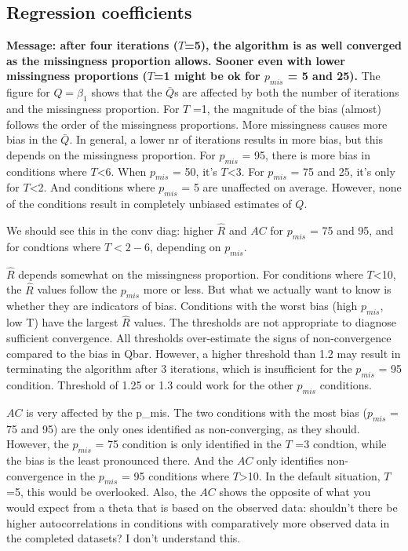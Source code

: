 \documentclass[Royal,times,sageh]{sagej}
\begin{document}
\hypertarget{regression-coefficients}{%
\subsection{Regression coefficients}\label{regression-coefficients}}

\textbf{Message: after four iterations (\(T\)=5), the algorithm is as well converged as the missingness proportion allows. Sooner even with lower missingness proportions (\(T\)=1 might be ok for \(p_{mis}\) = 5 and 25).} The figure for \(Q=\beta_1\) shows that the \(\bar{Q}\)s are affected by both the number of iterations and the missingness proportion. For \(T\) =1, the magnitude of the bias (almost) follows the order of the missingness proportions. More missingness causes more bias in the \(\bar{Q}\). In general, a lower nr of iterations results in more bias, but this depends on the missingness proportion. For \(p_{mis}\) = 95, there is more bias in conditions where \(T\)\textless6. When \(p_{mis}\) = 50, it's \(T\)\textless3. For \(p_{mis}\) = 75 and 25, it's only for \(T\)\textless2. And conditions where \(p_{mis}\) = 5 are unaffected on average. However, none of the conditions result in completely unbiased estimates of \(Q\).

We should see this in the conv diag: higher \(\widehat{R}\) and \(AC\) for \(p_{mis}\) = 75 and 95, and for condtions where \(T<2-6\), depending on \(p_{mis}\).

\(\widehat{R}\) depends somewhat on the missingness proportion. For conditions where \(T\)\textless10, the \(\widehat{R}\) values follow the \(p_{mis}\) more or less. But what we actually want to know is whether they are indicators of bias. Conditions with the worst bias (high \(p_{mis}\), low T) have the largest \(\widehat{R}\) values. The thresholds are not appropriate to diagnose sufficient convergence. All thresholds over-estimate the signs of non-convergence compared to the bias in Qbar. However, a higher threshold than 1.2 may result in terminating the algorithm after 3 iterations, which is insufficient for the \(p_{mis}\) = 95 condition. Threshold of 1.25 or 1.3 could work for the other \(p_{mis}\) conditions.

\(AC\) is very affected by the p\_mis. The two conditions with the most bias (\(p_{mis}\) = 75 and 95) are the only ones identified as non-converging, as they should. However, the \(p_{mis}\) = 75 condition is only identified in the \(T\) =3 condtion, while the bias is the least pronounced there. And the \(AC\) only identifies non-convergence in the \(p_{mis}\) = 95 conditions where \(T\)\textgreater10. In the default situation, \(T\) =5, this would be overlooked. Also, the \(AC\) shows the opposite of what you would expect from a theta that is based on the observed data: shouldn't there be higher autocorrelations in conditions with comparatively more observed data in the completed datasets? I don't understand this.
\end{document}
